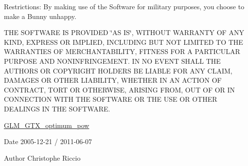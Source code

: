 Restrictions\-: By making use of the Software for military purposes, you choose to make a Bunny unhappy.

T\-H\-E S\-O\-F\-T\-W\-A\-R\-E I\-S P\-R\-O\-V\-I\-D\-E\-D \char`\"{}\-A\-S I\-S\char`\"{}, W\-I\-T\-H\-O\-U\-T W\-A\-R\-R\-A\-N\-T\-Y O\-F A\-N\-Y K\-I\-N\-D, E\-X\-P\-R\-E\-S\-S O\-R I\-M\-P\-L\-I\-E\-D, I\-N\-C\-L\-U\-D\-I\-N\-G B\-U\-T N\-O\-T L\-I\-M\-I\-T\-E\-D T\-O T\-H\-E W\-A\-R\-R\-A\-N\-T\-I\-E\-S O\-F M\-E\-R\-C\-H\-A\-N\-T\-A\-B\-I\-L\-I\-T\-Y, F\-I\-T\-N\-E\-S\-S F\-O\-R A P\-A\-R\-T\-I\-C\-U\-L\-A\-R P\-U\-R\-P\-O\-S\-E A\-N\-D N\-O\-N\-I\-N\-F\-R\-I\-N\-G\-E\-M\-E\-N\-T. I\-N N\-O E\-V\-E\-N\-T S\-H\-A\-L\-L T\-H\-E A\-U\-T\-H\-O\-R\-S O\-R C\-O\-P\-Y\-R\-I\-G\-H\-T H\-O\-L\-D\-E\-R\-S B\-E L\-I\-A\-B\-L\-E F\-O\-R A\-N\-Y C\-L\-A\-I\-M, D\-A\-M\-A\-G\-E\-S O\-R O\-T\-H\-E\-R L\-I\-A\-B\-I\-L\-I\-T\-Y, W\-H\-E\-T\-H\-E\-R I\-N A\-N A\-C\-T\-I\-O\-N O\-F C\-O\-N\-T\-R\-A\-C\-T, T\-O\-R\-T O\-R O\-T\-H\-E\-R\-W\-I\-S\-E, A\-R\-I\-S\-I\-N\-G F\-R\-O\-M, O\-U\-T O\-F O\-R I\-N C\-O\-N\-N\-E\-C\-T\-I\-O\-N W\-I\-T\-H T\-H\-E S\-O\-F\-T\-W\-A\-R\-E O\-R T\-H\-E U\-S\-E O\-R O\-T\-H\-E\-R D\-E\-A\-L\-I\-N\-G\-S I\-N T\-H\-E S\-O\-F\-T\-W\-A\-R\-E.

\hyperlink{group__gtx__optimum__pow}{G\-L\-M\-\_\-\-G\-T\-X\-\_\-optimum\-\_\-pow}

\begin{DoxyDate}{Date}
2005-\/12-\/21 / 2011-\/06-\/07 
\end{DoxyDate}
\begin{DoxyAuthor}{Author}
Christophe Riccio 
\end{DoxyAuthor}
